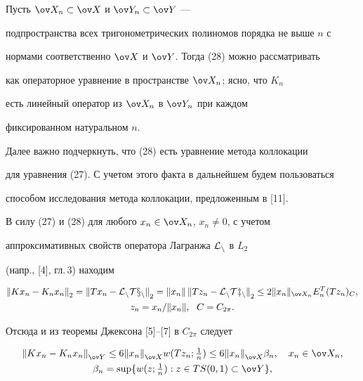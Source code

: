 \begin{pf}
Пусть $ \ov X_n \subset \ov X $ и $ \ov Y_n \subset \ov Y $ ---


подпространства всех тригонометрических полиномов порядка не выше $ n $ с


нормами соответственно $ \ov X $ и $ \ov Y $. Тогда (28) можно рассматривать


как операторное уравнение в пространстве $ \ov X_n $; ясно, что $ K_n $


есть линейный оператор из $ \ov X_n $ в $ \ov Y_n $ при каждом


фиксированном натуральном $ n $.





Далее важно подчеркнуть, что (28) есть уравнение метода коллокации


для уравнения (27). С учетом этого факта в дальнейшем будем пользоваться


способом исследования метода коллокации, предложенным в [11].





В силу (27) и (28) для любого $x_n \in \ov X_n$, $x_n \neq 0$, с учетом


аппроксимативных свойств оператора Лагранжа $\cal{L}_n $ в $ L_2 $


(напр., [4], гл.\,3) находим


\begin{gather*}


{\| Kx_n - K_nx_n \|}_2={\| Tx_n - \rL_n Tx_n \|}


_2=\| x_n \|\, {\| Tz_n - \rL_n Tz_n \|}_2 \leq


2 \| x_n \|_{\ov X_n} E_n^T(Tz_n)_{C},\\


z_n=x_n / \| x_n \|, \ \ C=C_{2 \pi}.


\end{gather*}


Отсюда и из теоремы Джексона [5]--[7] в $ C_{2 \pi} $ следует


\begin{gather*}


{\| Kx_n - K_nx_n \|}_{\ov Y} \leq 6 {\| x_n \|}_{\ov X}


w(Tz_n; \tfrac{1}{n}) \leq 6 {\| x_n \|}_{\ov X} \beta_n, \quad x_n


\in \ov X_n, \\


%


\beta_n=\sup \lbrace w(z; \tfrac{1}{n}) : z \in TS(0,1) \subset \ov Y \rbrace,



\end{gather*}
\end{pf}
